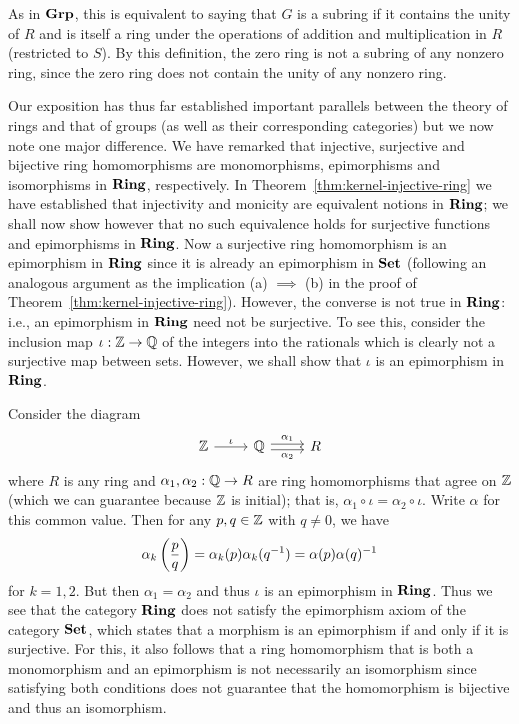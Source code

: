 As in \(\mathbf{Grp}\), this is equivalent to saying that \(G\) is a subring if it
contains the unity of \(R\) and is itself a ring under the operations of
addition and multiplication in \(R\) (restricted to \(S\)). By this definition,
the zero ring is not a subring of any nonzero ring, since the zero ring does not
contain the unity of any nonzero ring.

Our exposition has thus far established important parallels between the theory
of rings and that of groups (as well as their corresponding categories) but we
now note one major difference. We have remarked that injective, surjective and
bijective ring homomorphisms are monomorphisms, epimorphisms and isomorphisms in
\(\mathbf{Ring}\), respectively. In Theorem~\ref{thm:kernel-injective-ring} we have
established that injectivity and monicity are equivalent notions in \(\mathbf{Ring}\);
we shall now show however that no such equivalence holds for surjective
functions and epimorphisms in \(\mathbf{Ring}\). Now a surjective ring homomorphism is
an epimorphism in \(\mathbf{Ring}\) since it is already an epimorphism in \(\mathbf{Set}\)
(following an analogous argument as the implication (a) \(\implies\) (b) in the
proof of Theorem~\ref{thm:kernel-injective-ring}). However, the converse is not
true in \(\mathbf{Ring}\): i.e., an epimorphism in \(\mathbf{Ring}\) need not be surjective. To
see this, consider the inclusion map \(\iota: \mathbb{Z} \to \mathbb{Q}\) of the integers into
the rationals which is clearly not a surjective map between sets. However, we
shall show that \(\iota\) is an epimorphism in \(\mathbf{Ring}\).

Consider the diagram
\[
    \begin{tikzcd}
        \Z \arrow[r,"\iota"] & \Q \arrow[r,shift left=2pt,"\alpha_1"]\arrow[r,shift right=2pt,"\alpha_2", swap] &  R
    \end{tikzcd}
\]
where \(R\) is any ring and \(\alpha_1, \alpha_2: \mathbb{Q} \to R\) are ring
homomorphisms that agree on \(\mathbb{Z}\) (which we can guarantee because \(\mathbb{Z}\) is
initial); that is, \(\alpha_1 \circ \iota = \alpha_2 \circ \iota\). Write
\(\alpha\) for this common value. Then for any \(p, q \in \mathbb{Z}\) with \(q \neq
0\), we have
\[
    \alpha_k\left(\frac{p}{q}\right) = \alpha_k(p)\alpha_k(q^{-1}) = \alpha(p)\alpha(q)^{-1}
\]
for \(k = 1, 2\). But then \(\alpha_1 = \alpha_2\) and thus \(\iota\) is an
epimorphism in \(\mathbf{Ring}\). Thus we see that the category \(\mathbf{Ring}\) does not
satisfy the epimorphism axiom of the category \(\mathbf{Set}\), which states that a
morphism is an epimorphism if and only if it is surjective. For this, it also
follows that a ring homomorphism that is both a monomorphism and an epimorphism
is not necessarily an isomorphism since satisfying both conditions does not
guarantee that the homomorphism is bijective and thus an isomorphism.

